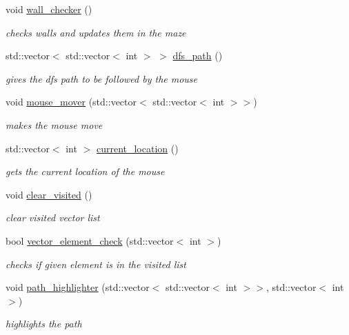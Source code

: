 \begin{DoxyCompactItemize}
void \hyperlink{classrwa2_1_1_mouse_a0ee088e89bdbb609091679ca66f98d37}{wall\+\_\+checker} ()
\begin{DoxyCompactList}\small\item\em checks walls and updates them in the maze \end{DoxyCompactList}\item 
std\+::vector$<$ std\+::vector$<$ int $>$ $>$ \hyperlink{classrwa2_1_1_mouse_ab9f225398c8ec07767559a47f2070755}{dfs\+\_\+path} ()
\begin{DoxyCompactList}\small\item\em gives the dfs path to be followed by the mouse \end{DoxyCompactList}\item 
void \hyperlink{classrwa2_1_1_mouse_a771abb2496a461ab78fa9d18fa8273ed}{mouse\+\_\+mover} (std\+::vector$<$ std\+::vector$<$ int $>$$>$)
\begin{DoxyCompactList}\small\item\em makes the mouse move \end{DoxyCompactList}\item 
std\+::vector$<$ int $>$ \hyperlink{classrwa2_1_1_mouse_a6c4e22fb4f67a100c011b634508a5c07}{current\+\_\+location} ()
\begin{DoxyCompactList}\small\item\em gets the current location of the mouse \end{DoxyCompactList}\item 
void \hyperlink{classrwa2_1_1_mouse_a3cb2cdc76a136c392e6a635adcfd2075}{clear\+\_\+visited} ()
\begin{DoxyCompactList}\small\item\em clear visited vector list \end{DoxyCompactList}\item 
bool \hyperlink{classrwa2_1_1_mouse_a069b6c1433777dd7d2709814aa418463}{vector\+\_\+element\+\_\+check} (std\+::vector$<$ int $>$)
\begin{DoxyCompactList}\small\item\em checks if given element is in the visited list \end{DoxyCompactList}\item 
void \hyperlink{classrwa2_1_1_mouse_a42834070b0bc9cee1993b745b85c2e29}{path\+\_\+highlighter} (std\+::vector$<$ std\+::vector$<$ int $>$$>$, std\+::vector$<$ int $>$)
\begin{DoxyCompactList}\small\item\em highlights the path \end{DoxyCompactList}\end{DoxyCompactItemize}


